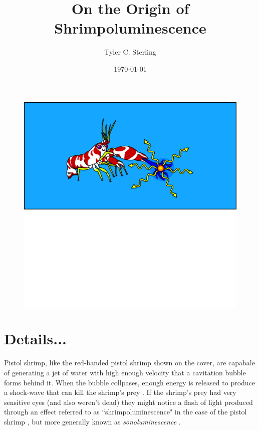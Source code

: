 \documentclass[prb,aps,12pt,superscriptaddress,floatfix]{revtex4-2}
\begin{document}
\title{\huge On the Origin of Shrimpoluminescence }

\author{\large Tyler C. Sterling}

\date{\today}


\maketitle



\begin{figure}
\includegraphics[width=1\linewidth]{figs/shrimpy2.pdf}
\label{fig:shrimpy}
\end{figure}

 
\newpage

\section{Details...}
Pistol shrimp, like the red-banded pistol shrimp shown on the cover, are capabale of generating a jet of water with high enough velocity that a cavitation bubble forms behind it. When the bubble collpases, enough energy is released to produce a shock-wave that can kill the shrimp's prey \cite{}. If the shrimp's prey had very sensitive eyes (and also weren't dead) they might notice a flash of light produced through an effect referred to as ``shrimpoluminescence" in the case of the pistol shrimp \cite{}, but more generally known as \emph{sonoluminescence} \cite{}.
\end{document}
